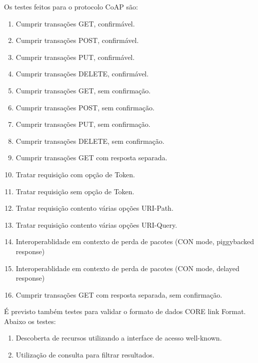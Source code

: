 Os testes feitos para o protocolo CoAP s\~ao:
\begin{enumerate}
    \item Cumprir transa\c{c}\~oes GET, confirm\'avel.
    \item Cumprir transa\c{c}\~oes POST, confirm\'avel.
    \item Cumprir transa\c{c}\~oes PUT, confirm\'avel.
    \item Cumprir transa\c{c}\~oes DELETE, confirm\'avel.
    \item Cumprir transa\c{c}\~oes GET, sem confirma\c{c}\~ao.
    \item Cumprir transa\c{c}\~oes POST, sem confirma\c{c}\~ao.
    \item Cumprir transa\c{c}\~oes PUT, sem confirma\c{c}\~ao.
    \item Cumprir transa\c{c}\~oes DELETE, sem confirma\c{c}\~ao. 
    \item Cumprir transa\c{c}\~oes GET com resposta separada.
    \item Tratar requisi\c{c}\~ao com op\c{c}\~ao de Token.
    \item Tratar requisi\c{c}\~ao sem op\c{c}\~ao de Token.
    \item Tratar requisi\c{c}\~ao contento v\'arias op\c{c}\~oes URI-Path.
    \item Tratar requisi\c{c}\~ao contento v\'arias op\c{c}\~oes URI-Query.
    \item Interoperablidade em contexto de perda de pacotes (CON mode, piggybacked response)
    \item Interoperablidade em contexto de perda de pacotes (CON mode, delayed response)
    \item Cumprir transa\c{c}\~oes GET com resposta separada, sem confirma\c{c}\~ao.
\end{enumerate}

\'E previsto tamb\'em testes para validar o formato de dados CORE link Format. Abaixo os testes:

\begin{enumerate}
    \item Descoberta de recursos utilizando a interface de acesso well-known.
    \item Utiliza\c{c}\~ao de consulta para filtrar resultados.
\end{enumerate}

